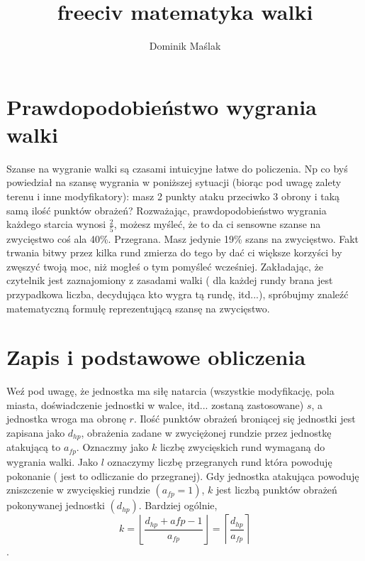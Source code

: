 \documentclass{article}
\title{freeciv matematyka walki }
\author{Dominik Maślak}
\begin{document}
\maketitle

\section{Prawdopodobieństwo wygrania walki}

Szanse na wygranie walki są czasami intuicyjne łatwe do policzenia. Np co byś powiedział na szansę wygrania w poniższej sytuacji (biorąc pod uwagę zalety terenu i inne modyfikatory): masz 2 punkty ataku przeciwko 3 obrony i taką samą ilość punktów obrażeń? Rozważając, prawdopodobieństwo wygrania każdego starcia wynosi  $\frac{2}{5}$, możesz myśleć, że to da ci sensowne szanse na zwycięstwo coś ala 40\%. Przegrana. Masz jedynie 19\% szans na zwycięstwo. Fakt trwania bitwy przez kilka rund zmierza do tego
by dać ci większe korzyści by zwęszyć twoją moc, niż mogłeś o tym pomyśleć wcześniej.
\newline
Zakładając, że czytelnik jest zaznajomiony z zasadami walki ( dla każdej rundy brana jest przypadkowa liczba, decydująca kto wygra tą rundę, itd...), spróbujmy znaleźć matematyczną formułę reprezentującą szansę na zwycięstwo.

\section{Zapis i podstawowe obliczenia}
Weź pod uwagę, że jednostka ma siłę natarcia (wszystkie modyfikację, pola miasta, doświadczenie jednostki w walce, itd... zostaną zastosowane) $s$, a jednostka wroga ma obronę $r$. Ilość punktów obrażeń broniącej się jednostki jest zapisana jako $d_{hp}$, obrażenia zadane w zwyciężonej rundzie przez jednostkę atakującą to $a_{fp}$.
\newline
Oznaczmy jako $k$ liczbę zwycięskich rund wymaganą do wygrania walki. Jako $l$ oznaczymy liczbę przegranych rund która powoduję pokonanie ( jest to odliczanie do przegranej). Gdy jednostka atakująca powoduję zniszczenie w zwycięskiej rundzie $( a_{fp} = 1)$, $k$ jest liczbą punktów obrażeń pokonywanej jednostki $(d_{hp})$. Bardziej ogólnie,
\begin{equation*}
    k =  
   \left\lfloor \frac{d_{hp} + a{fp - 1} }{a_{fp}} \right\rfloor = 
   \left\lceil \frac{d_{hp}}{a_{fp}} \right\rceil
\end{equation*}.
\end{document}
